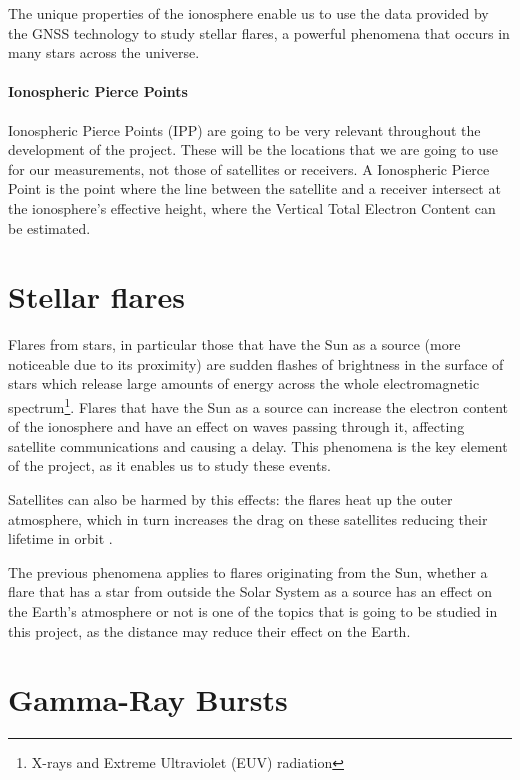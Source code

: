 The unique properties of the ionosphere enable us to use the data provided by the GNSS technology to study stellar flares, a powerful phenomena that occurs in many stars across the universe.

\paragraph{Ionospheric Pierce Points}

Ionospheric Pierce Points (IPP) are going to be very relevant throughout the development of the project. These will be the locations that we are going to use for our measurements, not those of satellites or receivers. A Ionospheric Pierce Point is the point where the line between the satellite and a receiver intersect at the ionosphere's effective height, where the Vertical Total Electron Content can be estimated. \cite{fu2000satellite}

\section{Stellar flares}

Flares from stars, in particular those that have the Sun as a source (more noticeable due to its proximity) are sudden flashes of brightness in the surface of stars which release large amounts of energy across the whole electromagnetic spectrum\footnote{X-rays and Extreme Ultraviolet (EUV) radiation}.
Flares that have the Sun as a source can increase the electron content of the ionosphere and have an effect on waves passing through it, affecting satellite communications and causing a delay. This phenomena is the key element of the project, as it enables us to study these events.

Satellites can also be harmed by this effects: the flares heat up the outer atmosphere, which in turn increases the drag on these satellites reducing their lifetime in orbit \cite{hernandez2012gnss}.

The previous phenomena applies to flares originating from the Sun, whether a flare that has a star from outside the Solar System as a source has an effect on the Earth’s atmosphere or not is one of the topics that is going to be studied in this project, as the distance may reduce their effect on the Earth.

\section{Gamma-Ray Bursts}

